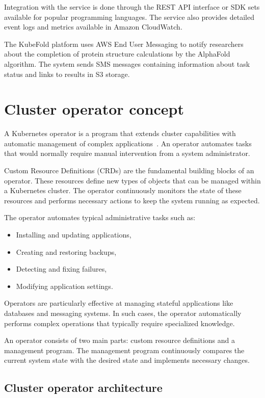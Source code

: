 Integration with the service is done through the REST API interface or SDK sets available for popular programming languages.
The service also provides detailed event logs and metrics available in Amazon CloudWatch.

The KubeFold platform uses AWS End User Messaging to notify researchers about the completion of protein structure calculations by the AlphaFold algorithm.
The system sends SMS messages containing information about task status and links to results in S3 storage.


\section{Cluster operator concept}

A Kubernetes operator is a program that extends cluster capabilities with automatic management of complex applications~\cite{k8s_operators}.
An operator automates tasks that would normally require manual intervention from a system administrator.

Custom Resource Definitions (CRDs) are the fundamental building blocks of an operator.
These resources define new types of objects that can be managed within a Kubernetes cluster.
The operator continuously monitors the state of these resources and performs necessary actions to keep the system running as expected.

The operator automates typical administrative tasks such as:
\begin{itemize}
    \item Installing and updating applications,
    \item Creating and restoring backups,
    \item Detecting and fixing failures,
    \item Modifying application settings.
\end{itemize}

Operators are particularly effective at managing stateful applications like databases and messaging systems.
In such cases, the operator automatically performs complex operations that typically require specialized knowledge.

An operator consists of two main parts: custom resource definitions and a management program.
The management program continuously compares the current system state with the desired state and implements necessary changes.

\subsection{Cluster operator architecture}

